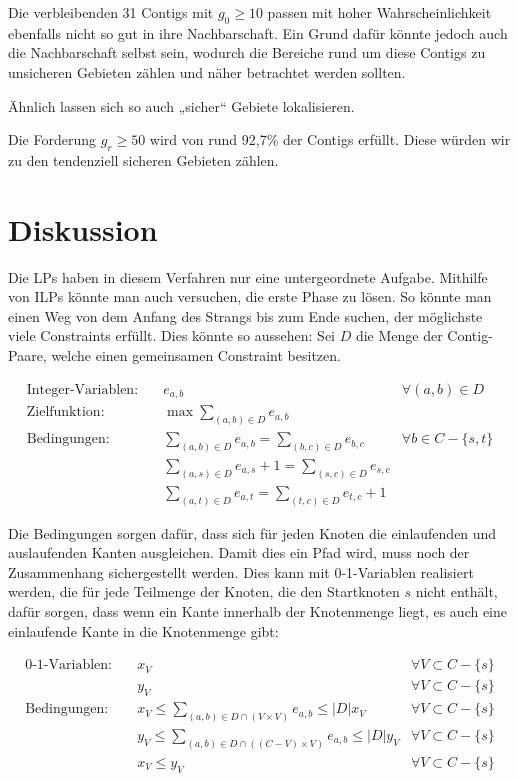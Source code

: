 Die verbleibenden 31 Contigs mit $g_0 \geq 10$ passen mit hoher Wahrscheinlichkeit ebenfalls nicht so gut in ihre Nachbarschaft. Ein Grund dafür könnte jedoch auch die Nachbarschaft selbst sein, wodurch die Bereiche rund um diese Contigs zu unsicheren Gebieten zählen und näher betrachtet werden sollten.


Ähnlich lassen sich so auch „sicher“ Gebiete lokalisieren.

Die Forderung $g_r \geq 50$ wird von rund 92,7\% der Contigs erfüllt. Diese würden wir zu den tendenziell sicheren Gebieten zählen.
\chapter{Diskussion}\raggedbottom 
Die LPs haben in diesem Verfahren nur eine untergeordnete Aufgabe. Mithilfe von ILPs könnte man auch versuchen, die erste Phase zu lösen.
So könnte man einen Weg von dem Anfang des Strangs bis zum Ende suchen, der möglichste viele Constraints erfüllt. 
Dies könnte so aussehen: Sei $D$ die Menge der Contig-Paare, welche einen gemeinsamen Constraint besitzen.

\begin{align*}
\text{Integer-Variablen:}\quad& e_{a,b} &\forall (a,b) \in D\\
\text{Zielfunktion:}\quad& \max \sum_{(a,b) \in D} e_{a,b}\\
\text{Bedingungen:}\quad& \sum_{(a,b) \in D} e_{a,b} = \sum_{(b,c) \in D} e_{b,c} &\forall b \in C-\{s,t\}\\
& \sum_{(a,s) \in D} e_{a,s}+1 = \sum_{(s,c) \in D} e_{s,c}\\
& \sum_{(a,t) \in D} e_{a,t} = \sum_{(t,c) \in D} e_{t,c} +1
\end{align*}

Die Bedingungen sorgen dafür, dass sich für jeden Knoten die einlaufenden und auslaufenden Kanten ausgleichen. Damit dies ein Pfad wird, muss noch der Zusammenhang sichergestellt werden. Dies kann mit 0-1-Variablen realisiert werden, die für jede Teilmenge der Knoten, die den Startknoten $s$ nicht enthält, dafür sorgen, dass wenn ein Kante innerhalb der Knotenmenge liegt, es auch eine einlaufende Kante in die Knotenmenge gibt:

\begin{align*}
\text{0-1-Variablen:}\quad& x_V &\forall V \subset C-\{s\}\\
\quad& y_V &\forall V \subset C-\{s\}\\
\text{Bedingungen:}\quad&  x_V \leq \sum_{(a,b) \in D \cap (V \times V)}  e_{a,b} \leq |D| x_V  &\forall V \subset C-\{s\}\\
\quad&  y_V \leq \sum_{(a,b) \in D \cap ((C-V) \times V)}  e_{a,b} \leq |D| y_V  &\forall V \subset C-\{s\}\\
\quad&  x_V \leq y_V  &\forall V \subset C-\{s\}
\end{align*}

